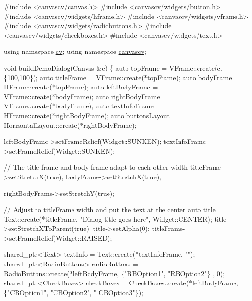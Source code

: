 \begin{DoxyCode}
\textcolor{preprocessor}{#include <canvascv/canvas.h>}
\textcolor{preprocessor}{#include <canvascv/widgets/button.h>}
\textcolor{preprocessor}{#include <canvascv/widgets/hframe.h>}
\textcolor{preprocessor}{#include <canvascv/widgets/vframe.h>}
\textcolor{preprocessor}{#include <canvascv/widgets/radiobuttons.h>}
\textcolor{preprocessor}{#include <canvascv/widgets/checkboxes.h>}
\textcolor{preprocessor}{#include <canvascv/widgets/text.h>}

\textcolor{keyword}{using namespace }\hyperlink{namespacecv}{cv};
\textcolor{keyword}{using namespace }\hyperlink{namespacecanvascv}{canvascv};

\textcolor{keywordtype}{void} buildDemoDialog(\hyperlink{classcanvascv_1_1Canvas}{Canvas} &c)
\{
    \textcolor{keyword}{auto} topFrame = VFrame::create(c, \{100,100\});
    \textcolor{keyword}{auto} titleFrame = VFrame::create(*topFrame);
    \textcolor{keyword}{auto} bodyFrame = HFrame::create(*topFrame);
    \textcolor{keyword}{auto} leftBodyFrame = VFrame::create(*bodyFrame);
    \textcolor{keyword}{auto} rightBodyFrame = VFrame::create(*bodyFrame);
    \textcolor{keyword}{auto} textInfoFrame = HFrame::create(*rightBodyFrame);
    \textcolor{keyword}{auto} buttonsLayout = HorizontalLayout::create(*rightBodyFrame);

    leftBodyFrame->setFrameRelief(Widget::SUNKEN);
    textInfoFrame->setFrameRelief(Widget::SUNKEN);

    \textcolor{comment}{// The title frame and body frame adapt to each other width}
    titleFrame->setStretchX(\textcolor{keyword}{true});
    bodyFrame->setStretchX(\textcolor{keyword}{true});

    rightBodyFrame->setStretchY(\textcolor{keyword}{true});

    \textcolor{comment}{// Adjust to titleFrame width and put the text at the center}
    \textcolor{keyword}{auto} title = Text::create(*titleFrame, \textcolor{stringliteral}{"Dialog title goes here"}, Widget::CENTER);
    title->setStretchXToParent(\textcolor{keyword}{true});
    title->setAlpha(0);
    titleFrame->setFrameRelief(Widget::RAISED);

    shared\_ptr<Text> textInfo = Text::create(*textInfoFrame, \textcolor{stringliteral}{""});
    shared\_ptr<RadioButtons> radioButtons = RadioButtons::create(*leftBodyFrame, \{\textcolor{stringliteral}{"RBOption1"}, \textcolor{stringliteral}{"RBOption2"}\}
      , 0);
    shared\_ptr<CheckBoxes> checkBoxes = CheckBoxes::create(*leftBodyFrame, \{\textcolor{stringliteral}{"CBOption1"}, \textcolor{stringliteral}{"CBOption2"}, \textcolor{stringliteral}{"
      CBOption3"}\});


\end{DoxyCode}
